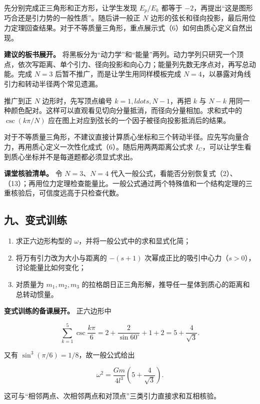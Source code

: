 \documentclass[12pt,a4paper,UTF8]{ctexart}
\newcommand{\tightlist}{\setlength{\itemsep}{0pt}\setlength{\parskip}{0pt}}
\begin{document}
先分别完成正三角形和正方形，让学生发现 \(E_p/E_k\) 都等于
\(-2\)，再提出``这是图形巧合还是引力势的一般性质''。随后讲一般正 \(N\)
边形的弦长和径向投影，最后用位力定理回查结果。对于不等质量三角形，重点展示式（6）如何由质心定义自然出现。

\textbf{建议的板书展开。}
将黑板分为``动力学''和``能量''两列。动力学列只研究一个顶点，依次写距离、单个引力、径向投影和向心力；能量列先数无序点对，再写总动能。完成
\(N=3\) 后暂不推广，而是让学生用同样模板完成
\(N=4\)，以暴露对角线引力和转动半径两个常见遗漏。

推广到正 \(N\) 边形时，先写顶点编号 \(k=1,ldots,N-1\)，再把 \(k\) 与
\(N-k\)
用同一种颜色配对。这样可以直观看见切向分量抵消，而径向分量相加。求和式中的
\(\csc(k\pi/N)\) 应在图上对应到弦长的一个因子被径向投影抵消后的结果。

对于不等质量三角形，不建议直接计算质心坐标和三个转动半径。应先写向量合力，再用质心定义一次性化成式（6）。随后用两两距离公式求
\(I_C\)，可以让学生看到质心坐标并不是每道题都必须显式求出。

\textbf{课堂核验清单。} 令 \(N=3\)、\(N=4\)
代入一般公式，看能否分别恢复式（2）、（13）；再用位力定理检查能量比。一般公式通过两个特殊值和一个结构定理的三重核验后，可信度远高于只检查代数。

\subsection{九、变式训练}\label{ux4e5dux53d8ux5f0fux8badux7ec3-1}

\begin{enumerate}
\def\labelenumi{\arabic{enumi}.}
\tightlist
\item
  求正六边形构型的 \(\omega\)，并将一般公式中的求和显式化简；
\item
  将万有引力改为大小与距离的 \(-(s+1)\)
  次幂成正比的吸引中心力（\(s>0\)），讨论能量比如何变化；
\item
  对质量为 \(m_1,m_2,m_3\)
  的拉格朗日正三角形解，推导任一星体到质心的距离和总转动惯量。
\end{enumerate}

\textbf{变式训练的备课展开。} 正六边形中

\[
\sum_{k=1}^{5}\csc\frac{k\pi}{6}
=2+\frac{2}{\sin60^\circ}+1+2
=5+\frac4{\sqrt3}.
\]

又有 \(\sin^3(\pi/6)=1/8\)，故一般公式给出

\[
\omega^2
=\frac{Gm}{4l^3}\left(5+\frac4{\sqrt3}\right).
\]

这可与``相邻两点、次相邻两点和对顶点''三类引力直接求和互相核验。
\end{document}
